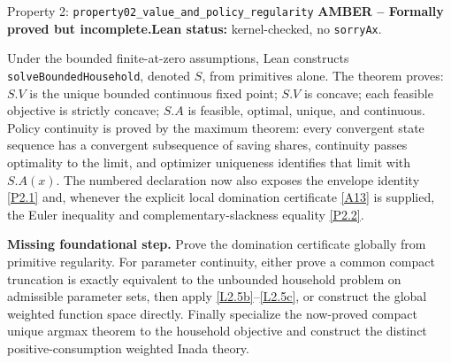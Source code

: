 \documentclass[11pt]{article}
\newcommand{\leanname}[1]{\nolinkurl{#1}}
\newcommand{\formalcheck}{\textbf{Lean status:} kernel-checked, no \texttt{sorryAx}.}
\newcommand{\missing}[1]{\par\smallskip\textbf{Missing foundational step.} #1}
\newcommand{\amberstatus}{\textcolor{conditional}{\textbf{AMBER -- Formally proved but incomplete.}}}
\begin{document}
\begin{amberbox}{Property 2: \leanname{property02_value_and_policy_regularity}}
\amberstatus\quad\formalcheck

Under the bounded finite-at-zero assumptions, Lean constructs
\leanname{solveBoundedHousehold}, denoted \(S\), from primitives alone.  The
theorem proves: \(S.V\) is the unique bounded continuous fixed point; \(S.V\)
is concave; each feasible objective is strictly concave; \(S.A\) is feasible,
optimal, unique, and continuous.  Policy continuity is proved by the maximum
theorem: every convergent state sequence has a convergent subsequence of
saving shares, continuity passes optimality to the limit, and optimizer
uniqueness identifies that limit with \(S.A(x)\).  The numbered declaration
now also exposes the envelope identity \eqref{P2.1} and, whenever the explicit
local domination certificate \eqref{A13} is supplied, the Euler inequality
and complementary-slackness equality \eqref{P2.2}.

\missing{Prove the domination certificate globally from primitive regularity.
For parameter continuity, either prove a common compact truncation is exactly
equivalent to the unbounded household problem on admissible parameter sets,
then apply \eqref{L2.5b}--\eqref{L2.5c}, or construct the global weighted
function space directly.  Finally specialize the now-proved compact unique
argmax theorem to the household objective and construct the distinct
positive-consumption weighted Inada theory.}
\end{amberbox}
\end{document}
